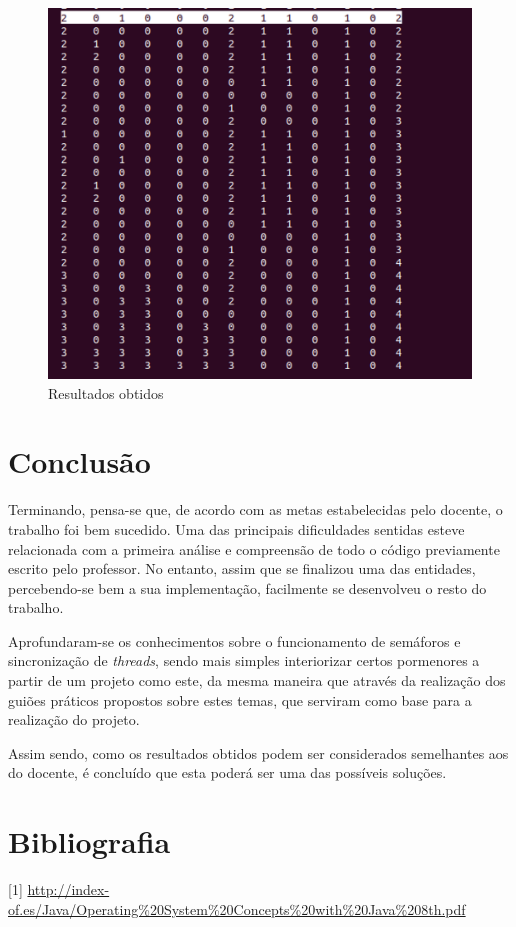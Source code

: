 \documentclass[10pt,portuguese]{article}
\begin{document}
\begin{figure}[!tH]
    \centering
    \includegraphics[scale=0.5]{images/resultados/res2.png}
    \caption{Resultados obtidos}
    \vspace*{10in} %
\end{figure}


\clearpage

\section{Conclusão}
\par Terminando, pensa-se que, de acordo com as metas estabelecidas pelo docente, o trabalho foi bem sucedido. Uma das principais dificuldades sentidas esteve relacionada com a primeira análise e compreensão de todo o código previamente escrito pelo professor. No entanto, assim que se finalizou uma das entidades, percebendo-se bem a sua implementação, facilmente se desenvolveu o resto do trabalho.
\par Aprofundaram-se os conhecimentos sobre o funcionamento de semáforos e sincronização de \textit{threads}, sendo mais simples interiorizar certos pormenores a partir de um projeto como este, da mesma maneira que através da realização dos guiões práticos propostos sobre estes temas, que serviram como base para a realização do projeto.
\par Assim sendo, como os resultados obtidos podem ser considerados semelhantes aos do docente, é concluído que esta poderá ser uma das possíveis soluções.

\clearpage

\section{Bibliografia}





\vspace{5mm} %

[1] \url{http://index-of.es/Java/Operating%20System%20Concepts%20with%20Java%208th.pdf}
\end{document}

